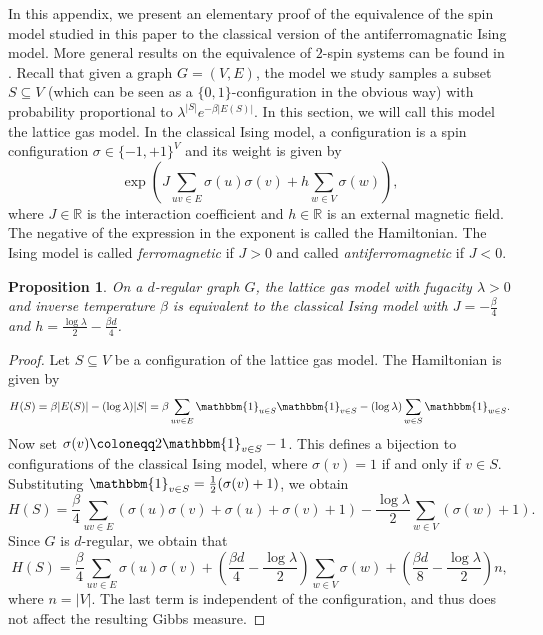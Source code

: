 \documentclass[reqno,a4paper,11pt]{amsart}
\newtheorem{proposition}[theorem]{Proposition}
\newcommand{\lam}{\lambda}
\begin{document}
In this appendix, we present an elementary proof of the equivalence of the spin model studied in this paper to the classical version of the antiferromagnatic Ising model. More general results on the equivalence of $2$-spin systems can be found in \cite{SuSly12}.
Recall that given a graph $G=(V, E)$, the model we study samples a subset $S\subseteq V$ (which can be seen as a $\{0,1\}$-configuration in the obvious way) with probability proportional to $\lam^{|S|} e^{-\beta |E(S)|}$.
In this section, we will call this model the lattice gas model.
In the classical Ising model, a configuration is a spin configuration $\sigma \in \{-1,+1\}^{V}$ and its weight is given by
\[
\exp\left({J \sum_{uv \in E} \sigma(u) \sigma(v) + h \sum_{w \in V} \sigma(w)}\right),
\]
where $J \in \mathbb{R}$ is the interaction coefficient and $h \in \mathbb{R}$ is an external magnetic field.
The negative of the expression in the exponent is called the Hamiltonian. The Ising model is called \textit{ferromagnetic} if $J > 0$ and called \textit{antiferromagnetic} if $J < 0$.

\begin{proposition}
    On a $d$-regular graph $G$, the lattice gas model with fugacity $\lam > 0$ and inverse temperature $\beta$ is equivalent to the classical Ising model with $J=-\frac{\beta}{4}$ and $h=\frac{\log \lam}{2} - \frac{\beta d}{4}$.
\end{proposition}

\begin{proof}
    Let $S \subseteq V$ be a configuration of the lattice gas model.
    The Hamiltonian is given by
    \[
    H(S)=\beta |E(S)| - (\log \lam)|S| = \beta \sum_{uv \in E} \mathbbm{1}_{u \in S} \mathbbm{1}_{v \in S} - (\log \lam) \sum_{w \in S} \mathbbm{1}_{w \in S}.
    \]
    Now set $\sigma(v)\coloneqq 2\mathbbm{1}_{v \in S} -1$. This defines a bijection to configurations of the classical Ising model, where $\sigma(v)=1$ if and only if $v \in S$. Substituting $\mathbbm{1}_{v \in S}= \frac{1}{2}(\sigma(v)+1)$, we obtain
    \[
    H(S)= \frac{\beta}{4} \sum_{uv \in E}\left( \sigma(u) \sigma(v) + \sigma(u)+\sigma(v) + 1\right) - \frac{\log \lam}{2} \sum_{w \in V} (\sigma(w)+1).
    \]
    Since $G$ is $d$-regular, we obtain that 
    \[
    H(S)= \frac{\beta}{4} \sum_{uv \in E} \sigma(u) \sigma(v) + \left( \frac{\beta d}{4} - \frac{\log \lam}{2} \right) \sum_{w \in V} \sigma(w) + \left(\frac{\beta d}{8} - \frac{\log \lam}{2} \right)n,
    \]
    where $n=|V|$. The last term is independent of the configuration, and thus does not affect the resulting Gibbs measure.
\end{proof}
\end{document}
